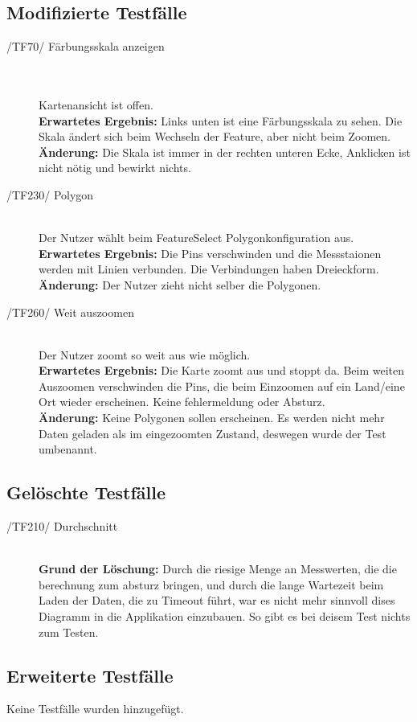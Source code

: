 \subsection{Modifizierte Testfälle}
\begin{description}
   	\item[/TF70/ Färbungsskala anzeigen] \hfill \\ \\  Kartenansicht ist offen. \\ \textbf{Erwartetes Ergebnis:} Links unten ist eine Färbungsskala zu sehen. Die Skala ändert sich beim Wechseln der Feature, aber nicht beim Zoomen. \\
\textbf{Änderung:} Die Skala ist immer in der rechten unteren Ecke, Anklicken ist nicht nötig und bewirkt nichts.

   	\item[/TF230/ Polygon] \hfill \\ Der Nutzer wählt beim FeatureSelect Polygonkonfiguration aus. \\ \textbf{Erwartetes Ergebnis:} Die Pins verschwinden und die Messstaionen werden mit Linien verbunden. Die Verbindungen haben Dreieckform. \\
\textbf{Änderung:} Der Nutzer zieht nicht selber die Polygonen.

\item[/TF260/ Weit auszoomen] \hfill \\ Der Nutzer zoomt so weit aus wie möglich.\\ \textbf{Erwartetes Ergebnis:} Die Karte zoomt aus und stoppt da. Beim weiten Auszoomen verschwinden die Pins, die beim Einzoomen auf ein Land/eine Ort wieder erscheinen. Keine fehlermeldung oder Absturz. \\
\textbf{Änderung:} Keine Polygonen sollen erscheinen. Es werden nicht mehr Daten geladen als im eingezoomten Zustand, deswegen wurde der Test umbenannt.
\end{description}

\subsection{Gelöschte Testfälle}
\begin{description}
   	\item[/TF210/ Durchschnitt] \hfill \\ \textbf{Grund der Löschung:} Durch die riesige Menge an Messwerten, die die berechnung zum absturz bringen, und durch die lange Wartezeit beim Laden der Daten, die zu Timeout führt, war es nicht mehr sinnvoll dises Diagramm in die Applikation einzubauen. So gibt es bei deisem Test nichts zum Testen. 

\end{description}


\subsection{Erweiterte Testfälle}

Keine Testfälle wurden hinzugefügt.

	





